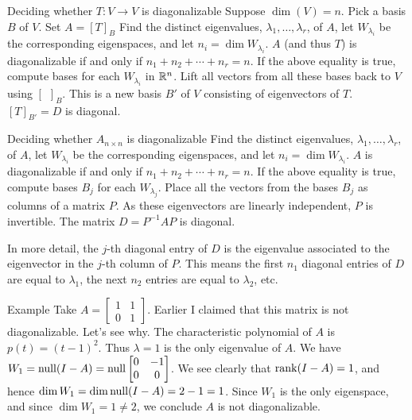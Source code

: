 \begin{frame}{Deciding whether $T\colon V\rightarrow V$ is diagonalizable}
Suppose $\dim(V)=n$. 
\bb
\ii Pick a basis $B$ of $V$. Set $A=[T]_B$
\pause\ii Find the distinct eigenvalues, $\lambda_1,\dots, \lambda_r$,  of $A$, let $W_{\lambda_i}$ be the corresponding eigenspaces, and let $n_i=\dim W_{\lambda_i}$.
\pause\ii $A$ (and thus $T$) is diagonalizable if and only if 
$
n_1+n_2+\cdots +n_r=n.
$ 
\pause\ii If the above equality is true, compute bases for each $W_{\lambda_i}$ in ${\mathbb R}^n$. 
\pause\ii Lift all vectors from all these bases back to $V$ using $[\hspace{5pt}]_B$. This is a new basis $B'$ of $V$ consisting of eigenvectors of $T$. 
\pause\ii $[T]_{B'}=D$ is diagonal. 
\ee

\end{frame}
\begin{frame}{Deciding whether $A_{n\times n}$ is diagonalizable}
\bb
\ii Find the distinct eigenvalues, $\lambda_1,\dots, \lambda_r$,  of $A$, let $W_{\lambda_i}$ be the corresponding eigenspaces, and let $n_i=\dim W_{\lambda_i}$.
\pause\ii $A$ is diagonalizable if and only if 
$
n_1+n_2+\cdots +n_r=n.
$ 
\pause\ii If the above equality is true, compute bases $B_j$ for each $W_{\lambda_j}$. 
\pause\ii Place all the vectors from the bases $B_j$ as columns of a matrix $P$. As these eigenvectors are linearly independent, $P$ is invertible.  
\pause\ii The matrix $D=P^{-1}AP$ is diagonal. 

In more detail, the $j$-th diagonal entry of $D$ is the eigenvalue associated to the eigenvector in the $j$-th column of $P$. This means the first $n_1$ diagonal entries of $D$ are equal to $\lambda_1$, the next $n_2$ entries are equal to $\lambda_2$, etc. 
\ee

\end{frame}
\begin{frame}{Example}
Take $A=\begin{bmatrix}
1&1\\
0&1
\end{bmatrix}$. Earlier I claimed that this matrix is not diagonalizable. Let's see why.
\bpause
The characteristic polynomial of $A$ is $p(t)=(t-1)^2$. Thus $\lambda=1$ is the only eigenvalue of $A$. 
\bpause
We have $W_1=\operatorname{null}(I-A)=\operatorname{null}\begin{bmatrix}
0&-1\\
0&0
\end{bmatrix}$. We see clearly that $\operatorname{rank}(I-A)=1$, and hence $\dim W_1=\dim\operatorname{null}(I-A)=2-1=1$. 
\bpause
Since $W_1$ is the only eigenspace, and since $\dim W_1=1\ne 2$, we conclude $A$ is not diagonalizable. 
\end{frame}

